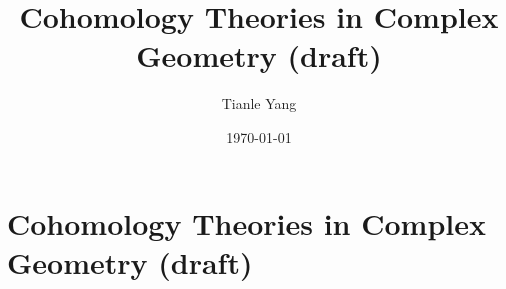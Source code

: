 \documentclass{noteformyself}
\title{Cohomology Theories in Complex Geometry (draft)}
\author{Tianle Yang}
\date{\today}
\begin{document}
    \maketitle
    \section{Cohomology Theories in Complex Geometry (draft)}




\end{document}
